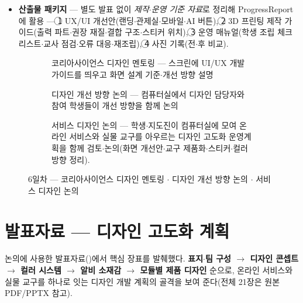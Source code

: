 \begin{itemize}
  \textbf{화성 주황 \#FF6A00}(강조$\cdot$발사대 포인트$\cdot$경고), 다크 네이비 \textbf{\#0D1117}$\cdot$%
  차콜 \textbf{\#4A515C}(본체$\cdot$패널), 화이트 \textbf{\#FFFFFF}$\cdot$라이트 그레이 \textbf{\#D9DDE2}(텍스트$\cdot$%
  정보 구조), 알비 \textbf{메탈릭 블루 \#1F6FAE}(기술$\cdot$신뢰).
  \item \textbf{산출물 패키지} — 별도 발표 없이 \emph{제작$\cdot$운영 기준 자료}로 정리해
  ProgressReport에 활용 — \textcircled{1} UX/UI 개선안(랜딩$\cdot$관제실$\cdot$모바일$\cdot$AI 버튼),
  \textcircled{2} 3D 프린팅 제작 가이드(출력 파트$\cdot$권장 재질$\cdot$결합 구조$\cdot$스티커 위치),
  \textcircled{3} 운영 매뉴얼(학생 조립 체크리스트$\cdot$교사 점검$\cdot$오류 대응$\cdot$재조립),
  \textcircled{4} 사진 기록(전$\cdot$후 비교).
\end{itemize}

\begin{figure}[htbp]\centering
  \begin{subfigure}{0.49\linewidth}\centering
    \caption{코리아사이언스 디자인 멘토링 — 스크린에 UI/UX 개발 가이드를 띄우고 화면 설계 기준$\cdot$개선 방향 설명}
  \end{subfigure}\hfill
  \begin{subfigure}{0.49\linewidth}\centering
    \caption{디자인 개선 방향 논의 — 컴퓨터실에서 디자인 담당자와 참여 학생들이 개선 방향을 함께 논의}
  \end{subfigure}

  \medskip
  \begin{subfigure}{0.8\linewidth}\centering
    \caption{서비스 디자인 논의 — 학생$\cdot$지도진이 컴퓨터실에 모여 온라인 서비스와 실물 교구를 아우르는 디자인 고도화 운영계획을 함께 검토$\cdot$논의(화면 개선안$\cdot$교구 제품화$\cdot$스티커$\cdot$컬러 방향 정리).}
  \end{subfigure}
  \caption{6일차 — 코리아사이언스 디자인 멘토링 $\cdot$ 디자인 개선 방향 논의 $\cdot$ 서비스 디자인 논의}
\end{figure}

\section{발표자료 — 디자인 고도화 계획}
논의에 사용한 발표자료()에서 핵심 장표를 발췌했다.
\textbf{표지$\cdot$팀 구성 $\to$ 디자인 콘셉트 $\to$ 컬러 시스템 $\to$ 알비 소재감 $\to$
모듈별 제품 디자인} 순으로, 온라인 서비스와 실물 교구를 하나로 잇는 디자인 개발
계획의 골격을 보여 준다(전체 21장은 원본 PDF/PPTX 참고).

